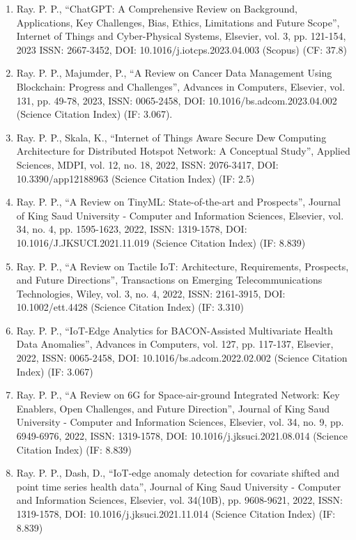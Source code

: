 \documentclass[11pt,a4paper]{moderncv}
\begin{document}
\begin{adjustwidth}{6em}{0pt}
\begin{enumerate}
		\item Ray. P. P., “ChatGPT: A Comprehensive Review on Background, Applications, Key Challenges, Bias, Ethics, Limitations and Future Scope”, Internet of Things and Cyber-Physical Systems, Elsevier, vol. 3, pp. 121-154, 2023 ISSN: 2667-3452, DOI: 10.1016/j.iotcps.2023.04.003 (Scopus) (CF: 37.8)
		
		\item Ray. P. P., Majumder, P., “A Review on Cancer Data Management Using Blockchain: Progress and Challenges”, Advances in Computers, Elsevier, vol. 131, pp. 49-78, 2023, ISSN: 0065-2458, DOI: 10.1016/bs.adcom.2023.04.002 (Science Citation Index) (IF: 3.067).
		
		\item Ray. P. P., Skala, K., “Internet of Things Aware Secure Dew Computing Architecture for Distributed Hotspot Network: A Conceptual Study”, Applied Sciences, MDPI, vol. 12, no. 18, 2022, ISSN: 2076-3417, DOI: 10.3390/app12188963 (Science Citation Index) (IF: 2.5)  
		
		\item Ray. P. P., “A Review on TinyML: State-of-the-art and Prospects”, Journal of King Saud University - Computer and Information Sciences, Elsevier, vol. 34, no. 4, pp. 1595-1623, 2022, ISSN: 1319-1578, DOI: 10.1016/J.JKSUCI.2021.11.019 (Science Citation Index) (IF: 8.839)
		
		\item Ray. P. P., “A Review on Tactile IoT: Architecture, Requirements, Prospects, and Future Directions”, Transactions on Emerging Telecommunications Technologies, Wiley, vol. 3, no. 4, 2022, ISSN: 2161-3915, DOI: 10.1002/ett.4428 (Science Citation Index) (IF: 3.310) 
		
		\item Ray. P. P., “IoT-Edge Analytics for BACON-Assisted Multivariate Health Data Anomalies”, Advances in Computers, vol. 127, pp. 117-137, Elsevier, 2022, ISSN: 0065-2458, DOI: 10.1016/bs.adcom.2022.02.002 (Science Citation Index) (IF: 3.067)
		
		\item Ray. P. P., “A Review on 6G for Space-air-ground Integrated Network: Key Enablers, Open Challenges, and Future Direction”, Journal of King Saud University - Computer and Information Sciences, Elsevier, vol. 34, no. 9, pp. 6949-6976, 2022, ISSN: 1319-1578, DOI: 10.1016/j.jksuci.2021.08.014 (Science Citation Index) (IF: 8.839) 
		
		\item Ray. P. P., Dash, D., “IoT-edge anomaly detection for covariate shifted and point time series health data”, Journal of King Saud University - Computer and Information Sciences, Elsevier, vol. 34(10B), pp. 9608-9621, 2022, ISSN: 1319-1578, DOI: 10.1016/j.jksuci.2021.11.014 (Science Citation Index) (IF: 8.839) 
		

\end{enumerate}
\end{adjustwidth}
\end{document}
